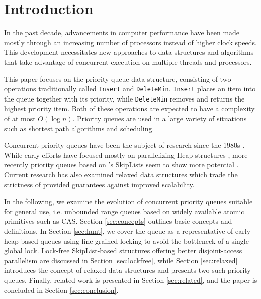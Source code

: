 \documentclass[a4paper,10pt]{article}
\begin{document}
\section{Introduction}


In the past decade, advancements in computer performance have been made mostly
through an increasing number of processors instead of higher clock speeds.
This development necessitates new approaches to data structures and algorithms
that take advantage of concurrent execution on multiple threads and processors. 


This paper focuses on the priority queue data structure, consisting of two operations
traditionally called \lstinline|Insert| and \lstinline|DeleteMin|. \lstinline|Insert|
places an item into the queue together with its priority, while \lstinline|DeleteMin|
removes and returns the highest priority item. Both of these operations are expected to have
a complexity of at most $O(\log n)$. Priority queues are used in a large variety
of situations such as shortest path algorithms and scheduling. %


Concurrent priority queues have been the subject of research since the 1980s
\cite{ayani1990lr,biswas1987simultaneous,das1996distributed,deo1992parallel,huang1991evaluation,
luchetti1993some,mans1998portable,olariu1991optimal,prasad1995parallel}.
While early efforts have focused mostly on parallelizing Heap structures
\cite{hunt1996efficient}, %
more recently priority queues based on \citeauthor{pugh1990skip}'s SkipLists
\cite{pugh1990skip} seem to show more potential \cite{shavit2000skiplist,
sundell2003fast,herlihy2012art,linden2013skiplist}. Current research has also examined
relaxed data structures \cite{wimmer2013data,alistarhspraylist} which trade
the strictness of provided guarantees against improved scalability.


In the following, we examine the evolution of concurrent priority queues suitable for general use,
i.e. unbounded range queues based on widely available atomic primitives such as \ac{CAS}.
Section \ref{sec:concepts} outlines basic concepts and definitions. In Section \ref{sec:hunt},
we cover the \citeauthor{hunt1996efficient} queue as a representative of early heap-based queues using
fine-grained locking to avoid the bottleneck of a single global lock. Lock-free SkipList-based
structures offering better disjoint-access parallelism are discussed in Section \ref{sec:lockfree},
while Section \ref{sec:relaxed} introduces the concept of relaxed data structures and presents two
such priority queues. Finally, related work is presented in Section \ref{sec:related}, and the paper is
concluded in Section \ref{sec:conclusion}.
\end{document}

